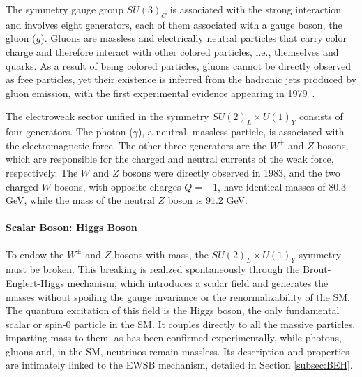The symmetry gauge group $SU(3)_C$ is associated with the strong interaction and involves eight generators, each of them associated with a gauge boson, the gluon ($g$). Gluons are massless and electrically neutral particles that carry color charge and therefore interact with other colored particles, i.e., themselves and quarks. As a result of being colored particles, gluons cannot be directly observed as free particles, yet their existence is inferred from the hadronic jets produced by gluon emission, with the first experimental evidence appearing in 1979~\cite{TASSO:1979zyf,Barber:1979yr,PLUTO:1979dxn,JADE:1979rke}.


The electroweak sector unified in the symmetry $SU(2)_L \times U(1)_Y$ consists of four generators. The photon ($\gamma$), a neutral, massless particle, is associated with the electromagnetic force. The other three generators are the $W^{\pm}$ and $Z$ bosons, which are responsible for the charged and neutral currents of the weak force, respectively. The $W$ and $Z$ bosons were directly observed in 1983, and the two charged $W$ bosons, with opposite charges $Q=\pm1$, have identical masses of $80.3$ GeV, while the mass of the neutral $Z$ boson is $91.2$ GeV.

\paragraph{Scalar Boson: Higgs Boson}
%
To endow the $W^{\pm}$ and $Z$ bosons with mass, the $SU(2)_L \times U(1)_Y$ symmetry must be broken. This breaking is realized spontaneously through the Brout-Englert-Higgs mechanism, which introduces a scalar field and generates the masses without spoiling the gauge invariance or the renormalizability of the SM. The quantum excitation of this field is the Higgs boson, the only fundamental scalar or spin-0 particle in the SM. It couples directly to all the massive particles, imparting mass to them, as has been confirmed experimentally, while photons, gluons and, in the SM, neutrinos remain massless. Its description and properties are intimately linked to the EWSB mechanism, detailed in Section \ref{subsec:BEH}.


